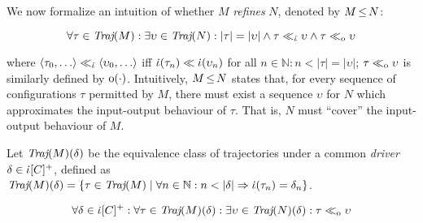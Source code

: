 We now formalize an intuition of whether $M$ \textit{refines} $N$, denoted by $M \operatorname{\leq} N$:

\begin{equation*}
\forall \tau \in \operatorname{\textit{Traj}}(M) : \exists \upsilon \in \operatorname{\textit{Traj}}(N) : | \tau | = | \upsilon | \wedge \tau \ll_{\dot{\iota}} \upsilon \wedge \tau \ll_{\mathrm{o}} \upsilon
\end{equation*}

\noindent where $\langle \tau_{0}, \ldots \rangle \ll_{\dot{\iota}} \langle \upsilon_{0}, \ldots \rangle$ iff $\dot{\iota}(\tau_{n}) \ll \dot{\iota}(\upsilon_{n})$ for all $n \in \mathbb{N} : n < | \tau | = | \upsilon |$; $\tau \ll_{\mathrm{o}} \upsilon$ is similarly defined by $\mathrm{o}(\cdot)$. Intuitively, $M \operatorname{\leq} N$ states that, for every sequence of configurations $\tau$ permitted by $M$, there must exist a sequence $\upsilon$ for $N$ which approximates the input-output behaviour of $\tau$. That is, $N$ must ``cover'' the input-output behaviour of $M$.

 Let $\operatorname{\textit{Traj}}(M)(\delta)$ be the equivalence class of trajectories under a common \textit{driver} $\delta \in \dot{\iota}[C]^{+}$, defined as $\operatorname{\textit{Traj}}(M)(\delta) = \{ \tau \in \operatorname{\textit{Traj}}(M) \mid \forall n \in \mathbb{N} : n < | \delta| \Rightarrow \dot{\iota}(\tau_{n}) = \delta_{n} \}$.

\begin{equation*}
\forall \delta \in \dot{\iota}[C]^{+} : \forall \tau \in \operatorname{\textit{Traj}}(M)(\delta) : \exists \upsilon \in \operatorname{\textit{Traj}}(N)(\delta) : \tau \ll_{\mathrm{o}} \upsilon
\end{equation*}


